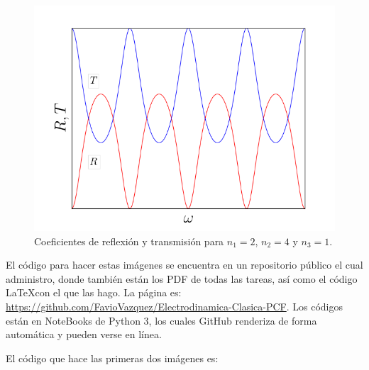 \documentclass[a4paper,11pt]{article}
\numberwithin{equation}{section}
\begin{document}
\begin{figure}[H]
 \center 
 \includegraphics[scale=0.5]{problema1fig3}
 \caption{Coeficientes de reflexión y transmisión para $n_1 = 2$, $n_2 = 4$ y $n_3 = 1$.}
\end{figure}

El código para hacer estas imágenes se encuentra en un repositorio público el cual 
administro, donde también están los PDF de todas las tareas, así como el código 
\LaTeX \space con el que las hago. La página es: 
\href{https://github.com/FavioVazquez/Electrodinamica-Clasica-PCF}{https://github.com/FavioVazquez/Electrodinamica-Clasica-PCF}.
Los códigos están en NoteBooks de Python 3, los cuales GitHub renderiza de forma 
automática y pueden verse en línea.

\vspace{.3cm} 

El código que hace las primeras dos imágenes es:
\end{document}
